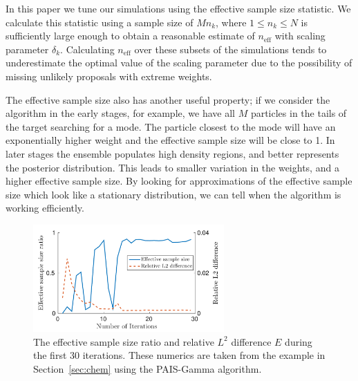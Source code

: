 \documentclass[final]{siamltex}
\newcommand{\neff}{n_{\text{eff}}}
\begin{document}

In this paper we tune our simulations using the effective sample size
statistic. We calculate this statistic using a sample size of $Mn_k$,
where $1 \leq n_k\leq N$ is sufficiently large enough to obtain a
reasonable estimate of $\neff$ with scaling parameter $\delta_k$.
Calculating $\neff$ over these subsets of the simulations tends to
underestimate the optimal value of the scaling parameter due to the
possibility of missing unlikely proposals with extreme weights.

The effective sample size also has another useful property; if we
consider the algorithm in the early stages, for example, we have all
$M$ particles in the tails of the target searching for a mode. The
particle closest to the mode will have an exponentially higher weight
and the effective sample size will be close to 1. In later stages the
ensemble populates high density regions, and better represents the
posterior distribution. This leads to smaller variation in the
weights, and a higher effective sample size. By looking for
approximations of the effective sample size which look like a
stationary distribution, we can tell when the algorithm is working
efficiently.

\begin{figure}[htb]
\centering
\includegraphics[width=0.65\textwidth]{"figures/C1_burnin"}
\caption{The effective sample size ratio and relative $L^2$ difference
$E$ during the first 30 iterations. These numerics are taken from the
example in Section~\ref{sec:chem} using the PAIS-Gamma algorithm.}
\label{fig:neff-burnin}
\end{figure}
\end{document}
